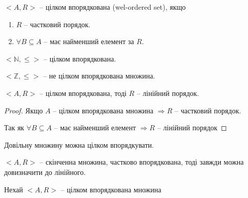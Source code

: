 \begin{definition}
    $<A, R>$ -- цілком впорядкована (wel-ordered set), якщо
    \begin{enumerate}
        \item $R$ -- частковий порядок.
        \item $\forall B \subseteq A$ -- має найменший елемент за $R$.
    \end{enumerate}
\end{definition}



\begin{example}
    $<\mathbb{N}, \leqslant>$ -- цілком впорядкована.
\end{example}

\begin{example}
    $<\mathbb{Z}, \leqslant>$ -- не цілком впорядкована множина.
\end{example}


\begin{lemma}
    $<A, R>$ -- цілком впорядкована, тоді $R$ -- лінійний
    порядок.
\end{lemma}
\begin{proof}
    Якщо $A$ -- цілком впорядкована множина 
    $\Rightarrow R$ -- частковий порядок.
    
    Так як $\forall B \subseteq A$ -- має найменший елемент
    $\Rightarrow R$ -- лінійний порядок
\end{proof}

\begin{theorem}
    Довільну множину можна цілком впорядкувати.
\end{theorem}

\begin{claim}
    $<A, R>$ -- скінченна множина, частково впорядкована, тоді
    завжди можна довизначити до лінійного.
\end{claim}




Нехай $<A, R>$ -- цілком впорядкована множина

